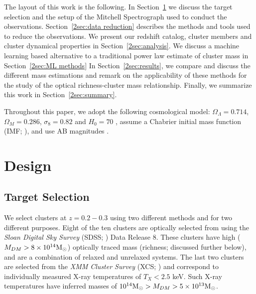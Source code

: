 The layout of this work is the following. In Section~\ref{2sec:design} we discuss the target selection and the setup of the Mitchell Spectrograph used to conduct the observations. Section~\ref{2sec:data reduction} describes the methods and tools used to reduce the observations. We present our redshift catalog, cluster members and cluster dynamical properties in Section~\ref{2sec:analysis}. We discuss a machine learning based alternative to a traditional power law estimate of cluster mass in Section~\ref{2sec:ML methods} In Section~\ref{2sec:results}, we compare and discuss the different mass estimations and remark on the applicability of these methods for the study of the optical richness-cluster mass relationship.  Finally, we summarize this work in Section~\ref{2sec:summary}.

Throughout this paper, we adopt the following cosmological model: $\Omega_\Lambda = 0.714$, $\Omega_M = 0.286$, $\sigma_8 = 0.82$ and $H_0= 70$ \kms \mpc, assume a Chabrier initial mass function (IMF; \citealt{Chabrier2003}), and use AB magnitudes \citep{Oke1974}.

\section{Design}\label{2sec:design} 
\subsection{Target Selection}\label{2sec:selection} 
We select clusters at $z=0.2-0.3$ using two different methods and for two different purposes. Eight of the ten clusters are optically selected from \cite{Rykoff2012} using the \textit{Sloan Digital Sky Survey} (SDSS; \citealt{Blanton2001a}) Data Release 8. These clusters have high ($M_{DM} > 8\times10^{14}\hbox{$\mathrm{M}_\odot$}$) optically traced mass (richness; discussed further below), and are a combination of relaxed and unrelaxed systems. The last two clusters are selected from the \textit{XMM Cluster Survey} (XCS; \citealt{Mehrtens2012}) and correspond to individually measured X-ray temperatures of $T_X < 2.5$ keV. Such X-ray temperatures have inferred masses of $10^{14}\hbox{$\mathrm{M}_\odot$} > M_{DM} > 5\times10^{13}\hbox{$\mathrm{M}_\odot$}$.

